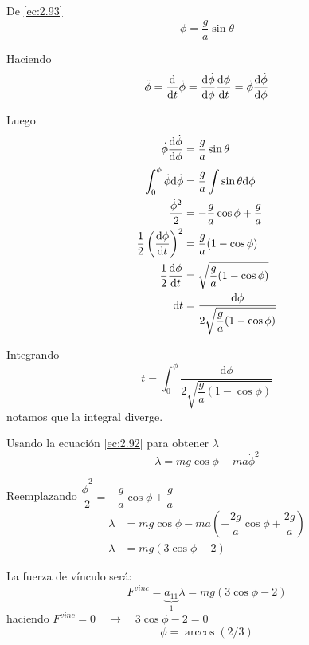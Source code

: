 \documentclass[../main]{subfiles}
\begin{document}
De \eqref{ec:2.93}
\begin{equation}
    \ddot{\phi}=\dfrac{g}{a}\sin \theta
\end{equation}

Haciendo
\begin{equation}
    \ddot{\phi}=\dv{}{t}\dot{\phi}=\dv{\dot{\phi}}{\phi}\dv{\phi}{t}=\dot{\phi}\dv{\dot{\phi}}{\phi}
\end{equation}

Luego 
\begin{equation}
    \begin{split}
        \dot{\phi}\dv{\dot{\phi}}{\phi}&=\dfrac{g}{a}\sin \theta \\
        \int_0^{\phi} \dot{\phi} \mathrm{d} \dot{\phi}&=\dfrac{g}{a}\int \sin \theta \mathrm{d}\phi \\
        \dfrac{\dot{\phi}^2}{2}&=-\dfrac{g}{a}\cos \phi+\dfrac{g}{a} \\
        \dfrac{1}{2}\left(\dv{\phi}{t}\right)^2&=\dfrac{g}{a}(1-\cos \phi) \\
        \dfrac{1}{2}\dv{\phi}{t}&=\sqrt{\dfrac{g}{a}(1-\cos \phi)} \\
        \mathrm{d}t&=\dfrac{\mathrm{d}\phi}{2\sqrt{\dfrac{g}{a}(1-\cos \phi)}}
    \end{split}
\end{equation}

Integrando 
\begin{equation}
    t= \int_0^{\phi} \dfrac{\mathrm{d}\phi}{2\sqrt{\dfrac{g}{a}(1-\cos \phi)}}
\end{equation}
notamos que la integral diverge.

Usando la ecuación \eqref{ec:2.92} para obtener $\lambda$
\begin{equation}
    \lambda = mg \cos \phi-ma \dot{\phi}^2
\end{equation}

Reemplazando $\displaystyle \dfrac{\dot{\phi}^2}{2}=-\dfrac{g}{a}\cos \phi+\dfrac{g}{a}$
\begin{equation}
    \begin{split}
        \lambda &=mg \cos\phi-ma\left(-\dfrac{2g}{a}\cos\phi+\dfrac{2g}{a}\right)\\
        \lambda &=mg(3\cos \phi-2)
    \end{split}
\end{equation}

La fuerza de vínculo será:
\begin{equation}
    F^{vinc}=\underbrace{a_{11}}_{1} \lambda=mg(3\cos \phi-2)
\end{equation}
haciendo $F^{vinc}=0 \quad \rightarrow \quad 3\cos \phi-2=0$
\begin{equation}
    \phi=\arccos(2/3)
\end{equation}
\end{document}
